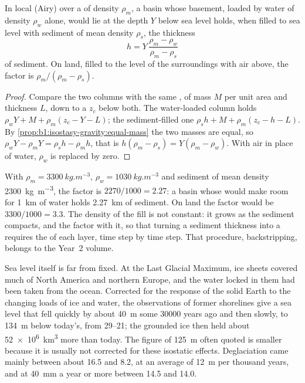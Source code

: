 \begin{proposition}\label{prop:b1:diagenesis-basins:loading}
In local (Airy)  over a  of density $\rho_m$, a basin whose
basement, loaded by water of density $\rho_w$ alone, would lie at the depth $Y$
below sea level holds, when filled to sea level with sediment of mean density
$\rho_s$, the thickness
\[
  h = Y\,\frac{\rho_m - \rho_w}{\rho_m - \rho_s}
\]
of sediment. On land, filled to the level of the surroundings with air above,
the factor is $\rho_m/(\rho_m - \rho_s)$.
\end{proposition}

\begin{proof}
Compare the two columns with the same , of mass $M$ per unit area and
thickness $L$, down to a  $z_c$ below both. The water-loaded
column holds $\rho_w Y + M + \rho_m(z_c - Y - L)$; the sediment-filled one
$\rho_s h + M + \rho_m(z_c - h - L)$. By
\cref{prop:b1:isostasy-gravity:equal-mass} the two masses are equal, so
$\rho_w Y - \rho_m Y = \rho_s h - \rho_m h$, that is $h(\rho_m - \rho_s) =
Y(\rho_m - \rho_w)$. With air in place of water, $\rho_w$ is replaced by zero.
\end{proof}

With $\rho_m = \qty{3300}{kg.m^{-3}}$, $\rho_w = \qty{1030}{kg.m^{-3}}$ and
sediment of mean density \qty{2300}{kg.m^{-3}}, the factor is
$2270/1000 = \num{2.27}$: a basin whose  would make room for
\qty{1}{km} of water holds \qty{2.27}{km} of sediment. On land the factor would
be $3300/1000 = \num{3.3}$. The density of the fill is not constant: it grows as
the sediment compacts, and the factor with it, so that turning a sediment
thickness into a  requires the  of each layer,
time step by time step. That procedure, backstripping, belongs to the Year~2
volume.

Sea level itself is far from fixed. At the Last Glacial Maximum, ice sheets
covered much of North America and northern Europe, and the water locked in them
had been taken from the ocean. Corrected for the response of the solid Earth to
the changing loads of ice and water, the observations of former shorelines give
a sea level that fell quickly by about \qty{40}{m} some \num{30000} years ago
and then slowly, to \qty{134}{m} below today's, from \qtyrange{29}{21}{\ka};
the grounded ice then held about \qty{52e6}{km^3} more than today. The figure
of \qty{125}{m} often quoted is smaller because it is usually not corrected for
these isostatic effects. Deglaciation came mainly between about \qty{16.5}{\ka}
and \qty{8.2}{\ka}, at an average of \qty{12}{m} per thousand years, and at
\qty{40}{mm} a year or more between \qty{14.5}{\ka} and \qty{14.0}{\ka}.

